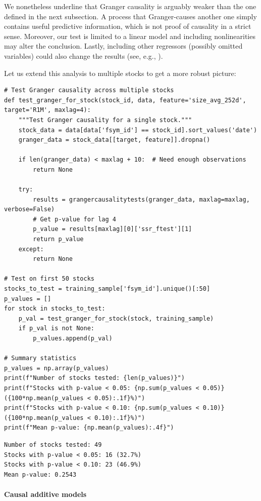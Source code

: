 We nonetheless underline that Granger causality is arguably weaker than the one defined in the next subsection. A process that Granger-causes another one simply contains useful predictive information, which is not proof of causality in a strict sense. Moreover, our test is limited to a linear model and including nonlinearities may alter the conclusion. Lastly, including other regressors (possibly omitted variables) could also change the results (see, e.g., \cite{chow2002multivariate}).

Let us extend this analysis to multiple stocks to get a more robust picture:

\begin{verbatim}
# Test Granger causality across multiple stocks
def test_granger_for_stock(stock_id, data, feature='size_avg_252d', target='R1M', maxlag=4):
    """Test Granger causality for a single stock."""
    stock_data = data[data['fsym_id'] == stock_id].sort_values('date')
    granger_data = stock_data[[target, feature]].dropna()
    
    if len(granger_data) < maxlag + 10:  # Need enough observations
        return None
    
    try:
        results = grangercausalitytests(granger_data, maxlag=maxlag, verbose=False)
        # Get p-value for lag 4
        p_value = results[maxlag][0]['ssr_ftest'][1]
        return p_value
    except:
        return None

# Test on first 50 stocks
stocks_to_test = training_sample['fsym_id'].unique()[:50]
p_values = []
for stock in stocks_to_test:
    p_val = test_granger_for_stock(stock, training_sample)
    if p_val is not None:
        p_values.append(p_val)

# Summary statistics
p_values = np.array(p_values)
print(f"Number of stocks tested: {len(p_values)}")
print(f"Stocks with p-value < 0.05: {np.sum(p_values < 0.05)} ({100*np.mean(p_values < 0.05):.1f}%)")
print(f"Stocks with p-value < 0.10: {np.sum(p_values < 0.10)} ({100*np.mean(p_values < 0.10):.1f}%)")
print(f"Mean p-value: {np.mean(p_values):.4f}")
\end{verbatim}

\begin{verbatim}
Number of stocks tested: 49
Stocks with p-value < 0.05: 16 (32.7%)
Stocks with p-value < 0.10: 23 (46.9%)
Mean p-value: 0.2543
\end{verbatim}

\paragraph{Causal additive models}

